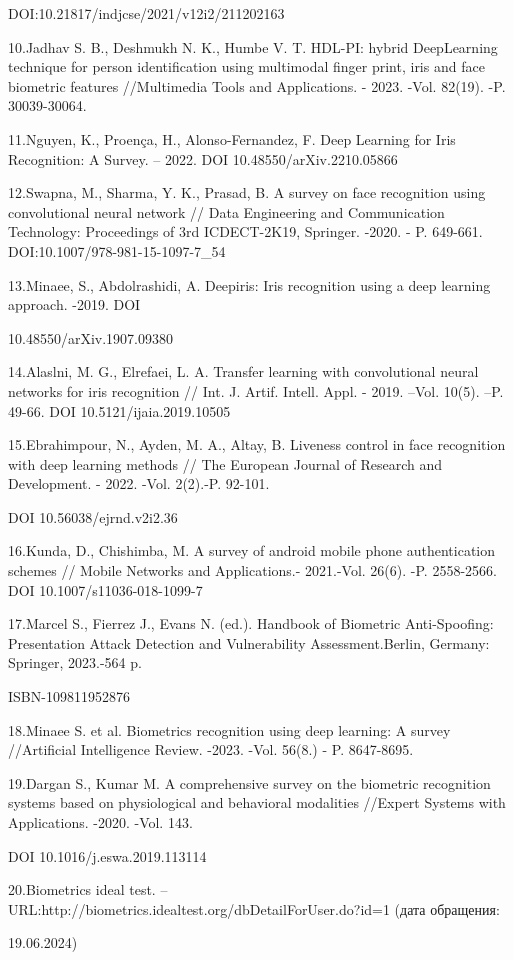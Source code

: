 \begin{noparindent}
DOI:10.21817/indjcse/2021/v12i2/211202163

10.Jadhav S. B., Deshmukh N. K., Humbe V. T. HDL-PI: hybrid DeepLearning
technique for person identification using multimodal finger print, iris
and face biometric features //Multimedia Tools and Applications. - 2023.
-Vol. 82(19). -P. 30039-30064.

11.Nguyen, K., Proença, H., Alonso-Fernandez, F. Deep Learning for Iris
Recognition: A Survey. -- 2022. DOI 10.48550/arXiv.2210.05866

12.Swapna, M., Sharma, Y. K., Prasad, B. A survey on face recognition
using convolutional neural network // Data Engineering and Communication
Technology: Proceedings of 3rd ICDECT-2K19, Springer. -2020. - P.
649-661. DOI:10.1007/978-981-15-1097-7\_54

13.Minaee, S., Abdolrashidi, A. Deepiris: Iris recognition using a deep
learning approach. -2019. DOI

10.48550/arXiv.1907.09380

14.Alaslni, M. G., Elrefaei, L. A. Transfer learning with convolutional
neural networks for iris recognition // Int. J. Artif. Intell. Appl. -
2019. --Vol. 10(5). --P. 49-66. DOI 10.5121/ijaia.2019.10505

15.Ebrahimpour, N., Ayden, M. A., Altay, B. Liveness control in face
recognition with deep learning methods // The European Journal of
Research and Development. - 2022. -Vol. 2(2).-P. 92-101.

DOI 10.56038/ejrnd.v2i2.36

16.Kunda, D., Chishimba, M. A survey of android mobile phone
authentication schemes // Mobile Networks and Applications.- 2021.-Vol.
26(6). -P. 2558-2566. DOI 10.1007/s11036-018-1099-7

17.Marcel S., Fierrez J., Evans N. (ed.). Handbook of Biometric
Anti-Spoofing: Presentation Attack Detection and Vulnerability
Assessment.Berlin, Germany: Springer, 2023.-564 p.

ISBN-109811952876

18.Minaee S. et al. Biometrics recognition using deep learning: A survey
//Artificial Intelligence Review. -2023. -Vol. 56(8.) - P. 8647-8695.

19.Dargan S., Kumar M. A comprehensive survey on the biometric
recognition systems based on physiological and behavioral modalities
//Expert Systems with Applications. -2020. -Vol. 143.

DOI 10.1016/j.eswa.2019.113114

20.Biometrics ideal test.
--URL:http://biometrics.idealtest.org/dbDetailForUser.do?id=1 (дата обращения:

19.06.2024)
\end{noparindent}

